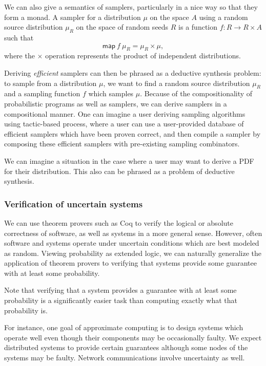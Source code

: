 \documentclass{article}           %
\begin{document}
We can also give a semantics of samplers, particularly in a nice way so that they form a monad. A sampler for a distribution $\mu$ on the space $A$ using a random source distribution $\mu_R$ on the space of random seeds $R$ is a function $ f : R \to R \times A$ such that
\[
  \mathsf{map}\ f \ \mu_R = \mu_R \times \mu,
\]
where the $\times$ operation represents the product of independent distributions.

Deriving \emph{efficient} samplers can then be phrased as a deductive synthesis problem: to sample from a distribution $\mu$, we want to find a random source distribution $\mu_R$ and a sampling function $f$ which samples $\mu$. Because of the compositionality of probabilistic programs as well as samplers, we can derive samplers in a compositional manner. One can imagine a user deriving sampling algorithms using tactic-based process, where a user can use a user-provided database of efficient samplers which have been proven correct, and then compile a sampler by composing these efficient samplers with pre-existing sampling combinators.

We can imagine a situation in the case where a user may want to derive a PDF for their distribution. This also can be phrased as a problem of deductive synthesis.

\subsubsection{Verification of uncertain systems}

We can use theorem provers such as Coq to verify the logical or absolute correctness of software, as well as systems in a more general sense. However, often software and systems operate under uncertain conditions which are best modeled as random. Viewing probability as extended logic, we can naturally generalize the application of theorem provers to verifying that systems provide some guarantee with at least some probability. 

Note that verifying that a system provides a guarantee with at least some probability is a significantly easier task than computing exactly what that probability is.

For instance, one goal of approximate computing is to design systems which operate well even though their components may be occasionally faulty. We expect distributed systems to provide certain guarantees although some nodes of the systems may be faulty. Network communications involve uncertainty as well.
\end{document}
